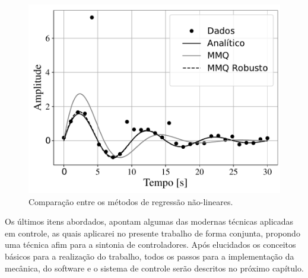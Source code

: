\begin{figure}[H]
  \caption{Comparação entre os métodos de regressão não-lineares.}
  \begin{center}
      \includegraphics[scale=0.7]{referencial/img/robust_regression}
  \end{center}
  \label{fig:robust_regression}
\end{figure}

Os últimos itens abordados, apontam algumas das modernas técnicas aplicadas em controle, as quais aplicarei no presente trabalho de forma conjunta, propondo uma técnica afim para a sintonia de controladores. Após elucidados os conceitos básicos para a realização do trabalho, todos os passos para a implementação da mecânica, do software e o sistema de controle serão descritos no próximo capítulo.